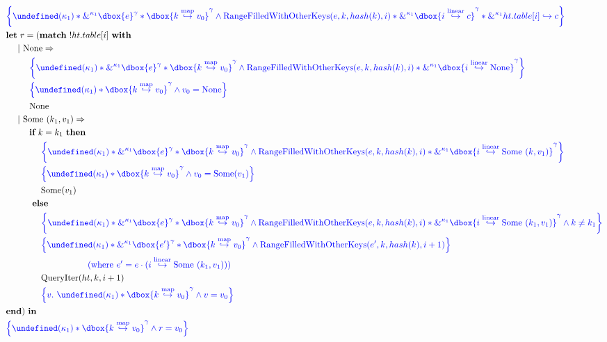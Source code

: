 \documentclass{article}
\DeclareMathOperator{\RangeFilledWithOtherKeys}{RangeFilledWithOtherKeys}
\newcommand\dboxed[1]{\dbox{\vphantom{t}\ensuremath{#1}}}
\newcommand{\borrow}[2]{\textsc{\&}^{#1}#2}
\newcommand{\pointsto}{\hookrightarrow}
\let\active\undefined
\DeclareMathOperator{\active}{active}
\begin{document}
\begin{align*}
  &\inlinehoare{\active(\kappa_1) * \borrow{\kappa_1}{\dboxed{e}^\gamma}
      * \dboxed{k \hashto v_0}^\gamma \land \RangeFilledWithOtherKeys(e, k, \hash(k), i) * \borrow{\kappa_1}{\dboxed{i\entryto c}^\gamma} * \borrow{\kappa_1}{ht.table[i] \pointsto c}}\\
  &\langlet r = (\langmatch~ !ht.table[i] ~\langwith\\
  &~~~~ |~ \None \Rightarrow \\
  &~~~~~~~~\inlinehoare{\active(\kappa_1) * \borrow{\kappa_1}{\dboxed{e}^\gamma}
      * \dboxed{k \hashto v_0}^\gamma \land \RangeFilledWithOtherKeys(e, k, \hash(k), i) * \borrow{\kappa_1}{\dboxed{i\entryto \None}^\gamma}}\\
  &~~~~~~~~\inlinehoare{\active(\kappa_1)
      * \dboxed{k \hashto v_0}^\gamma \land v_0 = \None}\\
  &~~~~~~~~\None\\
  &~~~~ |~ \Some~(k_1,v_1) \Rightarrow \\
  &~~~~~~~~\langif~ k = k_1 ~\langthen~ \\
  &~~~~~~~~~~~~\inlinehoare{\active(\kappa_1) * \borrow{\kappa_1}{\dboxed{e}^\gamma}
      * \dboxed{k \hashto v_0}^\gamma \land \RangeFilledWithOtherKeys(e, k, \hash(k), i) * \borrow{\kappa_1}{\dboxed{i\entryto \Some~(k,v_1)}^\gamma}}\\
  &~~~~~~~~~~~~\inlinehoare{\active(\kappa_1)
      * \dboxed{k \hashto v_0}^\gamma \land v_0 = \Some(v_1)}\\
  &~~~~~~~~~~~~\Some(v_1)\\
  &~~~~~~~~~\langelse~\\
  &~~~~~~~~~~~~\inlinehoare{\active(\kappa_1) * \borrow{\kappa_1}{\dboxed{e}^\gamma}
      * \dboxed{k \hashto v_0}^\gamma \land \RangeFilledWithOtherKeys(e, k, \hash(k), i) * \borrow{\kappa_1}{\dboxed{i\entryto \Some~(k_1,v_1)}^\gamma} \land k\ne k_1}\\
  &~~~~~~~~~~~~\inlinehoare{\active(\kappa_1) * \borrow{\kappa_1}{\dboxed{e'}^\gamma}
      * \dboxed{k \hashto v_0}^\gamma \land \RangeFilledWithOtherKeys(e', k, \hash(k), i+1)}\\
  &~~~~~~~~~~~~~~~~~~~~~~~~~~~~\text{\color{blue} (where $e' = e \cdot (i \entryto \Some~(k_1,v_1))$)}\\
  &~~~~~~~~~~~~\QueryIter(ht,k,i+1)\\
  &~~~~~~~~~~~~\inlinehoare{v.~ \active(\kappa_1) * \dboxed{k \hashto v_0}^\gamma \land v = v_0}\\
  &\langend) ~\langin\\
  &\inlinehoare{\active(\kappa_1)
      * \dboxed{k \hashto v_0}^\gamma \land r = v_0}
\end{align*}
\end{document}
